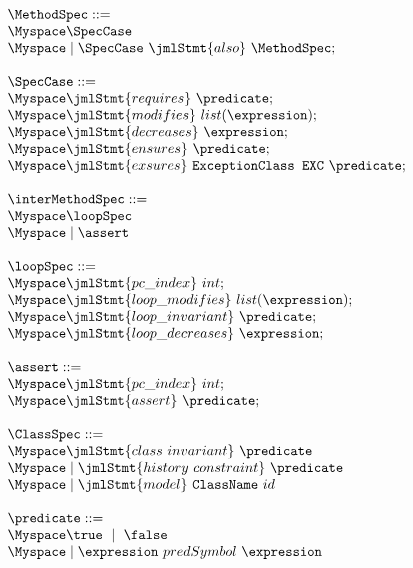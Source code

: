 \begin{figure}[!htbp]
$$ \begin{array}{l}
\MethodSpec  ::= \\
   \Myspace \SpecCase \\
   \Myspace  \mid  \SpecCase \  \jmlStmt{also} \  \MethodSpec	;\\
   \\
\SpecCase ::= \\ 
    \Myspace \jmlStmt{requires} \ \predicate;\\ 
	\Myspace \jmlStmt{modifies} \ list(\expression);\\
	\Myspace \jmlStmt{decreases} \ \expression;\\
    \Myspace \jmlStmt{ensures} \ \predicate;\\
    \Myspace \jmlStmt{exsures} \ \texttt{ExceptionClass EXC} \ \predicate;\\
                     \\
\interMethodSpec ::= \\
     \Myspace \loopSpec \\
	 \Myspace  \mid \assert \\
	  \\
\loopSpec ::= \\
		\Myspace \jmlStmt{pc\_ index} \ int;\\
	    \Myspace \jmlStmt{loop\_modifies} \ list(\expression);\\
       \Myspace \jmlStmt{loop\_invariant}  \ \predicate; \\
	   \Myspace \jmlStmt{loop\_decreases} \ \expression; \\
	 \\								
\assert   ::= \\
		\Myspace \jmlStmt{pc\_ index} \ int;\\
		\Myspace \jmlStmt{assert} \ \predicate; \\
	\\
\ClassSpec ::= \\ 
     \Myspace \jmlStmt{class \ invariant} \ \predicate \\
     \Myspace  \mid  \jmlStmt{history \ constraint} \ \predicate \\
     \Myspace  \mid  \jmlStmt{model} \ \texttt{ClassName}  \ id \\
      \\
      \predicate ::= \\
      \Myspace    \true \ \mid \ \false \\
      \Myspace  \mid   \expression \ predSymbol \ \expression \\

\end{array}$$
\end{figure}
